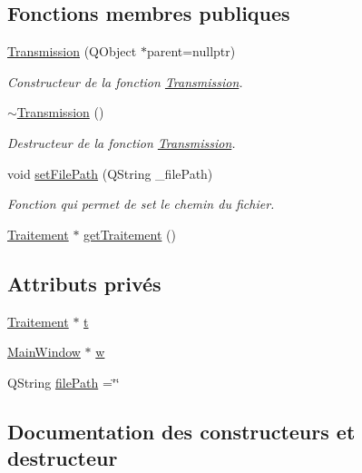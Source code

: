 \subsection*{Fonctions membres publiques}
\begin{DoxyCompactItemize}
\item 
\hyperlink{classTransmission_a1d8087d2d09b9ddd4fd6e8261daed9f3}{Transmission} (Q\+Object $\ast$parent=nullptr)
\begin{DoxyCompactList}\small\item\em Constructeur de la fonction \hyperlink{classTransmission}{Transmission}. \end{DoxyCompactList}\item 
\hyperlink{classTransmission_adcdc6012d99ddb1d0c3159d50984e146}{$\sim$\+Transmission} ()
\begin{DoxyCompactList}\small\item\em Destructeur de la fonction \hyperlink{classTransmission}{Transmission}. \end{DoxyCompactList}\item 
void \hyperlink{classTransmission_a5099a8d2ae60a2f159230bf81bafebdc}{set\+File\+Path} (Q\+String \+\_\+file\+Path)
\begin{DoxyCompactList}\small\item\em Fonction qui permet de set le chemin du fichier. \end{DoxyCompactList}\item 
\hyperlink{classTraitement}{Traitement} $\ast$ \hyperlink{classTransmission_af33687ff35d8e882db26c035ca6c053b}{get\+Traitement} ()
\end{DoxyCompactItemize}
\subsection*{Attributs privés}
\begin{DoxyCompactItemize}
\item 
\hyperlink{classTraitement}{Traitement} $\ast$ \hyperlink{classTransmission_ad05ceda47dcb0763e32e03e089defdb0}{t}
\item 
\hyperlink{classMainWindow}{Main\+Window} $\ast$ \hyperlink{classTransmission_a46ff40b83d046581408dce2027139fe0}{w}
\item 
Q\+String \hyperlink{classTransmission_a3514cc6116b900b586f8cbf194cb39e7}{file\+Path} =\char`\"{}\char`\"{}
\end{DoxyCompactItemize}


\subsection{Documentation des constructeurs et destructeur}
\mbox{\label{classTransmission_a1d8087d2d09b9ddd4fd6e8261daed9f3}} 

